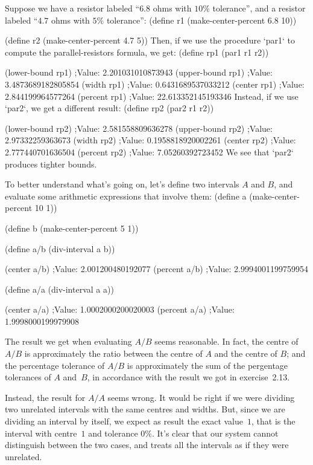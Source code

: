 Suppose we have a resistor labeled “$6.8$ ohms with $10\%$ tolerance”, and a resistor labeled “$4.7$ ohms with $5\%$ tolerance”:
\begtt\scm
(define r1 (make-center-percent 6.8 10))

(define r2 (make-center-percent 4.7 5))
\endtt
Then, if we use the procedure `par1` to compute the parallel-resistors formula, we get:
\begtt\scm
(define rp1 (par1 r1 r2))

(lower-bound rp1)
;Value: 2.201031010873943
(upper-bound rp1)
;Value: 3.4873689182805854
(width rp1)
;Value: 0.6431689537033212
(center rp1)
;Value: 2.844199964577264
(percent rp1)
;Value: 22.613352145193346
\endtt
Instead, if we use `par2`, we get a different result:
\begtt\scm
(define rp2 (par2 r1 r2))

(lower-bound rp2)
;Value: 2.581558809636278
(upper-bound rp2)
;Value: 2.97332259363673
(width rp2)
;Value: 0.1958818920002261
(center rp2)
;Value: 2.777440701636504
(percent rp2)
;Value: 7.05260392723452
\endtt
We see that `par2` produces tighter bounds.

To better understand what's going on, let's define two intervals $A$ and $B$, and evaluate some arithmetic expressions that involve them:
\begtt\scm
(define a (make-center-percent 10 1))

(define b (make-center-percent 5 1))

(define a/b (div-interval a b))

(center a/b)
;Value: 2.001200480192077
(percent a/b)
;Value: 2.9994001199759954

(define a/a (div-interval a a))

(center a/a)
;Value: 1.0002000200020003
(percent a/a)
;Value: 1.9998000199979908
\endtt

The result we get when evaluating $A/B$ seems reasonable.  In fact, the centre of $A/B$ is approximately the ratio between the centre of $A$ and the centre of $B$; and the percentage tolerance of $A/B$ is approximately the sum of the pergentage tolerances of $A$ and~$B$, in accordance with the result we got in exercise~2.13.

Instead, the result for $A/A$ seems wrong.  It would be right if we were dividing two unrelated intervals with the same centres and widths.  But, since we are dividing an interval by itself, we expect as result the exact value~$1$, that is the interval with centre~$1$ and tolerance $0\%$.  It's clear that our system cannot distinguish between the two cases, and treats all the intervals as if they were unrelated.
